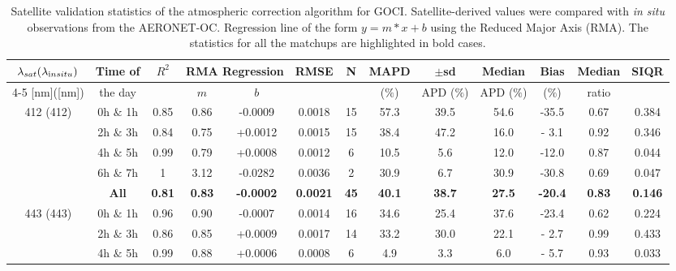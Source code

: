 \documentclass[onecolumn,3p,letterpaper,11pt]{elsarticle}
\begin{document}
\begin{table}[htbp!]
\caption{Satellite validation statistics of the atmospheric correction algorithm for GOCI. Satellite-derived values were compared with {\it in situ} observations from the AERONET-OC. Regression line of the form $y=m*x+b$ using the Reduced Major Axis (RMA). The statistics for all the matchups are highlighted in bold cases. \label{tab:val_stats} }
\tiny
\centering
\begin{tabular}{ccccccccccccc} 
 \hline 
$\lambda_{sat} (\lambda_{\text in situ})$ & Time of & $R^2$ & \multicolumn{2}{c}{RMA Regression} & RMSE & N & MAPD & $\pm$sd & Median & Bias & Median & SIQR \\ \cline{4-5}
[nm]([nm])                  &  the day            &         & $m$     & $b$     &             &     & ($\%$)  & APD ($\%$)  & APD ($\%$)  & ($\%$)   & ratio   &         \\ \hline 
\multirow{5}{*}{412 (412)}  &  0h $\&$ 1h  & 0.85    & 0.86    & -0.0009 & 0.0018      & 15  & 57.3    & 39.5        & 54.6        & -35.5    & 0.67    & 0.384   \\ 
                            &  2h $\&$ 3h  & 0.84    & 0.75    & +0.0012 & 0.0015      & 15  & 38.4    & 47.2        & 16.0        & - 3.1    & 0.92    & 0.346   \\ 
                            &  4h $\&$ 5h  & 0.99    & 0.79    & +0.0008 & 0.0012      & 6   & 10.5    &  5.6        & 12.0        & -12.0    & 0.87    & 0.044   \\ 
                            &  6h $\&$ 7h  & 1       & 3.12    & -0.0282 & 0.0036      & 2   & 30.9    &  6.7        & 30.9        & -30.8    & 0.69    & 0.047   \\ 
                              &  \textbf{All}         & \textbf{0.81}    & \textbf{0.83}    & \textbf{-0.0002} & \textbf{0.0021}      & \textbf{45}  & \textbf{40.1}    & \textbf{38.7}        & \textbf{27.5}        & \textbf{-20.4}    & \textbf{0.83}    & \textbf{0.146}   \\ \hline 
\multirow{5}{*}{443 (443)}  &  0h $\&$ 1h  & 0.96    & 0.90    & -0.0007 & 0.0014      & 16  & 34.6    & 25.4        & 37.6        & -23.4    & 0.62    & 0.224   \\ 
                            &  2h $\&$ 3h  & 0.86    & 0.85    & +0.0009 & 0.0017      & 14  & 33.2    & 30.0        & 22.1        & - 2.7    & 0.99    & 0.433   \\ 
                            &  4h $\&$ 5h  & 0.99    & 0.88    & +0.0006 & 0.0008      & 6   &  4.9    &  3.3        &  6.0        & - 5.7    & 0.93    & 0.033   \\ 

\end{tabular}
\end{table}
\end{document}
